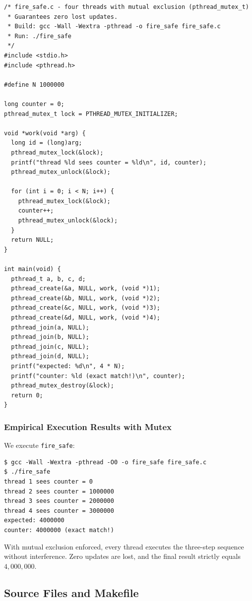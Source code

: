 \documentclass{labreport}
\begin{document}
\begin{lstlisting}[style=c]
/* fire_safe.c - four threads with mutual exclusion (pthread_mutex_t)
 * Guarantees zero lost updates.
 * Build: gcc -Wall -Wextra -pthread -o fire_safe fire_safe.c
 * Run: ./fire_safe
 */
#include <stdio.h>
#include <pthread.h>

#define N 1000000

long counter = 0;
pthread_mutex_t lock = PTHREAD_MUTEX_INITIALIZER;

void *work(void *arg) {
  long id = (long)arg;
  pthread_mutex_lock(&lock);
  printf("thread %ld sees counter = %ld\n", id, counter);
  pthread_mutex_unlock(&lock);

  for (int i = 0; i < N; i++) {
    pthread_mutex_lock(&lock);
    counter++;
    pthread_mutex_unlock(&lock);
  }
  return NULL;
}

int main(void) {
  pthread_t a, b, c, d;
  pthread_create(&a, NULL, work, (void *)1);
  pthread_create(&b, NULL, work, (void *)2);
  pthread_create(&c, NULL, work, (void *)3);
  pthread_create(&d, NULL, work, (void *)4);
  pthread_join(a, NULL);
  pthread_join(b, NULL);
  pthread_join(c, NULL);
  pthread_join(d, NULL);
  printf("expected: %d\n", 4 * N);
  printf("counter: %ld (exact match!)\n", counter);
  pthread_mutex_destroy(&lock);
  return 0;
}
\end{lstlisting}

\subsubsection{Empirical Execution Results with Mutex}
We execute \texttt{fire\_safe}:

\begin{lstlisting}[style=bash]
$ gcc -Wall -Wextra -pthread -O0 -o fire_safe fire_safe.c
$ ./fire_safe
thread 1 sees counter = 0
thread 2 sees counter = 1000000
thread 3 sees counter = 2000000
thread 4 sees counter = 3000000
expected: 4000000
counter: 4000000 (exact match!)
\end{lstlisting}

With mutual exclusion enforced, every thread executes the three-step sequence without interference. Zero updates are lost, and the final result strictly equals $4{,}000{,}000$.

\subsection{Source Files and Makefile}
\end{document}
